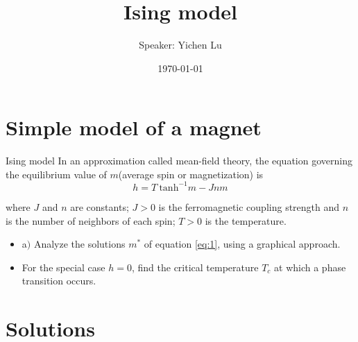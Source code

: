 \documentclass[10pt,aspectratio=43,mathserif,table]{beamer}
\title{Ising model}
\author{Speaker: Yichen Lu\quad \newline  \newline \quad }
\institute{\fontsize{8pt}{14pt}}
\date{\today}
\newcommand{\concept}{Ising model}
\begin{document}

\frame{\titlepage}


\section{Simple model of a magnet}

\begin{frame}{\concept}
	In an approximation called mean-field theory, the equation governing the equilibrium value of $m$(average spin or magnetization) is
	\begin{equation}\label{eq:1}
		h = T\ \mathrm{tanh}^{-1}m - Jnm	
	\end{equation}
	
	
	where $J$ and $n$ are constants; $J > 0$ is the ferromagnetic coupling strength and $n$ is the number of neighbors of each spin; $T > 0$ is the temperature.
	\begin{itemize}
		\item a$)$ Analyze the solutions $m^*$ of equation \ref{eq:1}, using a graphical approach.
		\item For the special case $h = 0$, find the critical temperature $T_c$ at which a phase transition occurs.
	\end{itemize}
\end{frame}

\section{Solutions}
\end{document}
